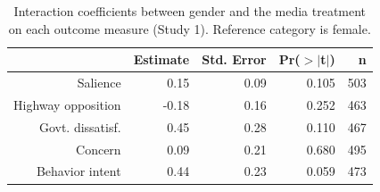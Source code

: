 \begin{table}[ht]
\centering
\caption{Interaction coefficients between gender and the media
             treatment on each outcome measure (Study 1). Reference category is
             female.} 
\label{tab:disruption_bygender}
\begin{tabular}{rrrrr}
  \hline
 & Estimate & Std. Error & Pr($>$$|$t$|$) & n \\ 
  \hline
Salience & 0.15 & 0.09 & 0.105 & 503 \\ 
  Highway opposition & -0.18 & 0.16 & 0.252 & 463 \\ 
  Govt. dissatisf. & 0.45 & 0.28 & 0.110 & 467 \\ 
  Concern & 0.09 & 0.21 & 0.680 & 495 \\ 
  Behavior intent & 0.44 & 0.23 & 0.059 & 473 \\ 
   \hline
\end{tabular}
\end{table}
